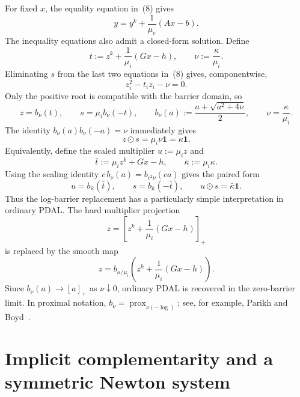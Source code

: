 \documentclass[10pt]{article}
\newcommand{\one}{\mathbf{1}}
\newcommand{\prox}{\operatorname{prox}}
\newcommand{\pos}[1]{\left[#1\right]_{+}}
\begin{document}
For fixed $x$, the equality equation in~(8) gives
\begin{equation}
y=y^k+\frac{1}{\mu_e}(Ax-b).
\end{equation}
The inequality equations also admit a closed-form solution. Define
\begin{equation}
t:=z^k+\frac{1}{\mu_i}(Gx-h),
\qquad
\nu:=\frac{\kappa}{\mu_i}.
\end{equation}
Eliminating $s$ from the last two equations in~(8) gives, componentwise,
\begin{equation}
z_i^2-t_i z_i-\nu=0.
\end{equation}
Only the positive root is compatible with the barrier domain, so
\begin{equation}
\boxed{
z=b_\nu(t),
\qquad
s=\mu_i b_\nu(-t),
\qquad
b_\nu(a):=\frac{a+\sqrt{a^2+4\nu}}{2},
\qquad
\nu=\frac{\kappa}{\mu_i}.}
\end{equation}
The identity $b_\nu(a)b_\nu(-a)=\nu$ immediately gives
\begin{equation}
z\odot s=\mu_i\nu\one=\kappa\one.
\end{equation}
Equivalently, define the scaled multiplier $u:=\mu_i z$ and
\begin{equation}
\bar t:=\mu_i z^k+Gx-h,
\qquad
\bar\kappa:=\mu_i\kappa.
\end{equation}
Using the scaling identity $c\,b_\nu(a)=b_{c^2\nu}(ca)$ gives the paired form
\begin{equation}
\boxed{
u=b_{\bar\kappa}(\bar t),
\qquad
s=b_{\bar\kappa}(-\bar t),
\qquad
u\odot s=\bar\kappa\one.}
\end{equation}
Thus the log-barrier replacement has a particularly simple interpretation in ordinary PDAL. The hard multiplier projection
\begin{equation}
z=\pos{z^k+\frac{1}{\mu_i}(Gx-h)}
\end{equation}
is replaced by the smooth map
\begin{equation}
z=b_{\kappa/\mu_i}\!\left(z^k+\frac{1}{\mu_i}(Gx-h)\right).
\end{equation}
Since $b_\nu(a)\to[a]_+$ as $\nu\downarrow0$, ordinary PDAL is recovered in the zero-barrier limit. In proximal notation, $b_\nu=\prox_{\nu(-\log)}$; see, for example, Parikh and Boyd~\cite{parikh2014proximal}.

\section{Implicit complementarity and a symmetric Newton system}
\end{document}
